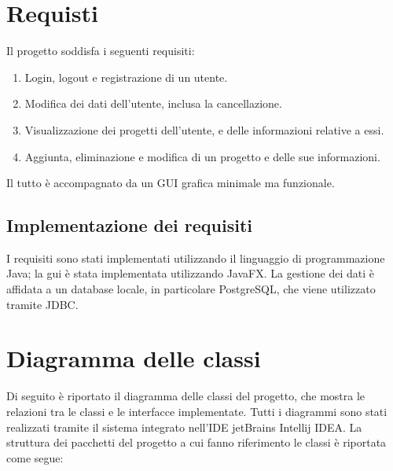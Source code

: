 \documentclass[
    10pt, %
    a4paper, %
    oneside, %
    headinclude,footinclude, %
    BCOR5mm, %
]{scrartcl}
\begin{document}


    \section{Requisti}\label{sec:Requisiti}

    Il progetto soddisfa i seguenti requisiti:

    \begin{enumerate}[noitemsep] %
        \item Login, logout e registrazione di un utente.
        \item Modifica dei dati dell'utente, inclusa la cancellazione.
        \item Visualizzazione dei progetti dell'utente, e delle informazioni relative a essi.
        \item Aggiunta, eliminazione e modifica di un progetto e delle sue informazioni.
    \end{enumerate}

    Il tutto è accompagnato da un GUI grafica minimale ma funzionale.

    \subsection{Implementazione dei requisiti}\label{subsec:implementazione}

    I requisiti sono stati implementati utilizzando il linguaggio di programmazione Java;
    la gui è stata implementata utilizzando JavaFX\@.
    La gestione dei dati è affidata a un database locale, in particolare PostgreSQL, che viene utilizzato
    tramite JDBC\@.


    \section{Diagramma delle classi}\label{sec:diagramma}

    Di seguito è riportato il diagramma delle classi del progetto, che mostra le relazioni tra le classi
    e le interfacce implementate.
    Tutti i diagrammi sono stati realizzati tramite il sistema integrato nell'IDE jetBrains Intellij IDEA\@.
    \vspace{0.5cm}
    La struttura dei pacchetti del progetto a cui fanno riferimento le classi è riportata come segue:
\end{document}
